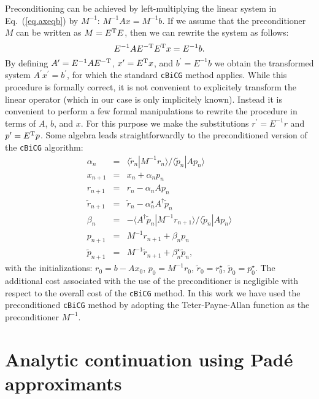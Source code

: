 \documentclass[twocolumn,prb,showpacs,superscriptaddress]{revtex4}
\def\>{\rangle}
\def\<{\langle}
\def\rt{\tilde{r}}
\def\pt{\tilde{p}}
\begin{document}
Preconditioning can be achieved by left-multiplying the linear system 
in Eq.\ (\ref{eq.axeqb}) 
by $M^{-1}$: $M^{-1}Ax=M^{-1}b$. If we assume that the preconditioner $M$ can be 
written as $M=E^{\rm T}E$, then we can rewrite the system as follows:
  \begin{equation}
  E^{-1}AE^{-{\rm T}} E^{\rm T}x = E^{-1}b.
  \end{equation}
By defining $A^\prime=E^{-1}AE^{-{\rm T}}$, $x^\prime=E^{\rm T}x$, and $b^\prime=E^{-1}b$
we obtain the transformed system $A^\prime x^\prime=b^\prime$, for which the
standard {\tt cBiCG} method applies.
While this procedure is formally correct, it is not convenient to explicitely
transform the linear operator (which in our case is only implicitely
known). Instead it is convenient to perform a few formal manipulations 
to rewrite the procedure in terms of
$A$, $b$, and $x$. For this purpose we make the substitutions
$r^\prime = E^{-1}r$ and $p^\prime=E^{\rm T} p$. Some algebra leads straightforwardly
to the preconditioned version of the {\tt cBiCG} algorithm:
  \begin{eqnarray}
  \alpha_n & = & \<\rt_n|M^{-1}r_n\>/\<\pt_n|Ap_n\>  \\
  x_{n+1} & = & x_n + \alpha_n p_n \\ 
  r_{n+1} & = & r_n - \alpha_n Ap_n \\ 
  \rt_{n+1} & = & \rt_n - \alpha_n^\star A^\dagger \pt_n \\ 
  \beta_n & = & - \<A^\dagger\pt_n|M^{-1}r_{n+1}\>/\<\pt_n|Ap_n\> \\ 
  p_{n+1} & = & M^{-1}r_{n+1} + \beta_n p_n \\ 
  \pt_{n+1} & = & M^{-1}\rt_{n+1} + \beta_n^\star \pt_n, 
  \end{eqnarray}
with the initializations: $r_0=b-Ax_0$, $p_0=M^{-1}r_0$, $\rt_0=r_0^\star$,
$\pt_0=p_0^\star$.
The additional cost associated with the use of the preconditioner is negligible
with respect to the overall cost of the {\tt cBiCG} method.
In this work we have used the preconditioned {\tt cBiCG} method 
by adopting the Teter-Payne-Allan function as the preconditioner $M^{-1}$.\cite{tpa}

\section{Analytic continuation using Pad\'e approximants}\label{app.pade}
\end{document}
